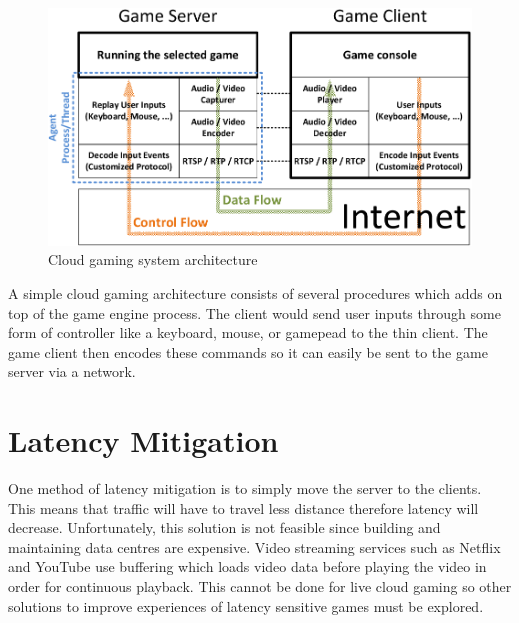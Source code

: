 \clearpage
\begin{figure}
 \includegraphics[width=\linewidth]{images/arch.png}
 \caption{Cloud gaming system architecture}
 \label{fig:arch}
\end{figure}

A simple cloud gaming architecture consists of several procedures which adds on top of the game engine process. The client would send user inputs through some form of controller like a keyboard, mouse, or gamepead to the thin client. The game client then encodes these commands so it can easily be sent to the game server via a network. 

\section{Latency Mitigation}
One method of latency mitigation is to simply move the server to the clients. This means that traffic will have to travel less distance therefore latency will decrease. Unfortunately, this solution is not feasible since building and maintaining data centres are expensive. Video streaming services such as Netflix and YouTube use buffering which loads video data before playing the video in order for continuous playback. This cannot be done for live cloud gaming so other solutions to improve experiences of latency sensitive games must be explored.


